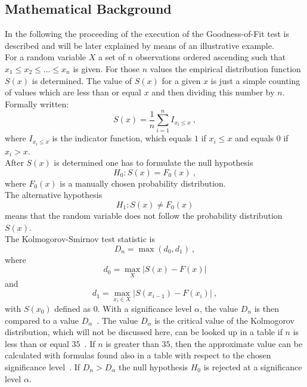 \documentclass{article}
\theoremstyle{definition}
\begin{document}
\subsection{Mathematical Background}
In the following the proceeding of the execution of the Goodness-of-Fit test is described and will be later explained by means of an illustrative example. \\
For a random variable $X$ a set of $n$ observations ordered ascending such that $x_1 \le x_2 \le ... \le x_n$ is given. For those $n$ values the empirical distribution function $S(x)$  is determined.
The value of $S(x)$ for a given $x$ is just a simple counting of values which are less than or equal $x$ and then dividing this number by $n$. Formally written: 
$$S(x) = \frac{1}{n} \sum\limits^n_{i=1} I_{x_i\le x}~,$$
where $I_{x_i\le x}$ is the indicator function, which equals $1$ if $x_i\le x$ and equals $0$ if $x_i>x$.\\
After $S(x)$  is determined one has to formulate the null hypothesis 
$$H_0:S (x)=F_0 (x)~,$$ 
where $F_0 (x)$ is a manually chosen probability distribution.\\
The alternative hypothesis 
$$H_1:S (x)\ne F_0 (x)$$ 
means that the random variable does not follow the probability distribution $S(x)$.\\
The Kolmogorov-Smirnov test statistic is
$$D_n = \max (d_0,d_1)~,$$
where 
$$d_0=\max_{X} |S(x)-F(x)|$$ 
and
$$d_1 = \max_{x_i \in X} | S(x_{i-1})-F(x_i)|~,$$
with $S (x_0)$  defined as $0$. With a significance level $\alpha$, the value $D_n$ is then compared to a value $D_\alpha$~\cite{nagcKS}.
The value $D_\alpha$ is the critical value of the Kolmogorov distribution, which will not be discussed here, can be looked up in a table if $n$ is less than or equal $35$~\cite{massey1951}. If $n$ is greater than $35$, then the approximate value can be calculated with formulas found also in a table with respect to the chosen significance level~\cite{massey1951}. If $D_n>D_\alpha$ the null hypothesis $H_0$  is rejected at a significance level $\alpha$.

\end{document}
